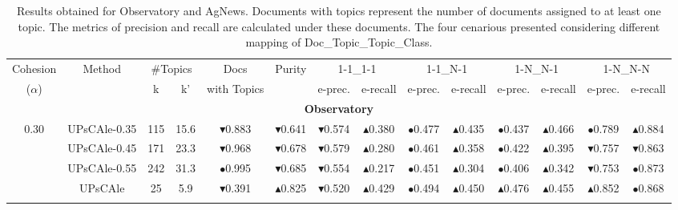 
\newcommand{\green}{\textcolor[rgb]{00,0.45,0.10}{$\blacktriangle$}}
\newcommand{\red}{\textcolor[rgb] {0.7,00,00}{$\blacktriangledown$}}
\newcommand{\norm}{\textcolor[rgb]{0.7,0.7,0.0}{$\bullet$}}




\begin{sidewaystable}
\caption{ Results obtained for Observatory and AgNews. Documents with topics represent the number of documents assigned to at least one topic. The metrics of precision and recall are calculated under these documents. The four cenarious presented considering different mapping of Doc\_Topic\_Topic\_Class. \\}
\label{tbl:topics}



\begin{tabular}{|c||c|c|c|c||c|c|c|c|c|c|c|c|c|}
\hline
Cohesion&\multirow{2}{*}{Method}&\multicolumn{2}{c|}{\#Topics}&Docs &\multirow{2}{*}{Purity}&\multicolumn{2}{c|}{1-1\_1-1} &\multicolumn{2}{c|}{1-1\_N-1} &\multicolumn{2}{c|}{1-N\_N-1} &\multicolumn{2}{c|}{1-N\_N-N}\\ \cline{3-4}\cline{7-14}
         	($\alpha$) &          &     k    &      k'       & with Topics    &  & e-prec.   & e-recall          & e-prec.   & e-recall          & e-prec.   & e-recall          & e-prec.   & e-recall          
\\ \hline \hline

 \multicolumn{14}{|c|}{\textbf{Observatory}} 
\\ \hline \hline

\multirow{4}{*}{0.30} 
  & UPsCAle-0.35 & 115& 15.6 & \red 0.883 & \red 0.641 & \red 0.574 & \green 0.380 & \norm  0.477 & \green 0.435 & \norm  0.437 & \green 0.466 & \norm 0.789 & \green 0.884
\\ 
 & UPsCAle-0.45 & 171& 23.3 & \red 0.968 & \red 0.678 & \red 0.579 & \green 0.280 & \norm 0.461 & \green 0.358 & \norm 0.422 & \green 0.395 & \red 0.757 & \red 0.863
\\ \index{•}
 & UPsCAle-0.55 & 242& 31.3 & \norm 0.995 & \red 0.685 & \red 0.554 & \green 0.217 & \norm 0.451 & \green 0.304 & \norm 0.406 & \green 0.342 & \red 0.753 & \norm 0.873
\\
& UPsCAle & 25 & 5.9 & \red 0.391 & \green 0.825 & \red 0.520 & \green 0.429 & \norm  0.494 & \green 0.450 & \green 0.476 & \green 0.455 & \green 0.852 & \norm 0.868
\\ \hline{}


\end{tabular}
\end{sidewaystable}
